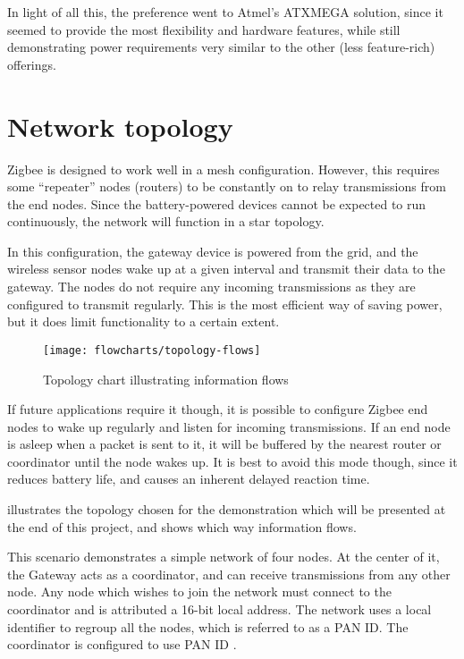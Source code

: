 In light of all this, the preference went to Atmel's ATXMEGA solution, since it
seemed to provide the most flexibility and hardware features, while still
demonstrating power requirements very similar to the other (less feature-rich)
offerings.


\pagebreak
\section{Network topology}
\label{sec:network-topology}

Zigbee is designed to work well in a mesh configuration. However, this requires
some ``repeater'' nodes (routers) to be constantly on to relay transmissions
from the end nodes. Since the battery-powered devices cannot be expected to run
continuously, the network will function in a star topology.

In this configuration, the gateway device is powered from the grid, and the
wireless sensor nodes wake up at a given interval and transmit their data to the
gateway. The nodes do not require any incoming transmissions as they are
configured to transmit regularly. This is the most efficient way of saving
power, but it does limit functionality to a certain extent.

\begin{figure}[h]
  \begin{center}
    \texttt{[image: flowcharts/topology-flows]}
  \end{center}
  \caption{Topology chart illustrating information flows}
  \label{fig:topology-flows}
\end{figure}

If future applications require it though, it is possible to configure Zigbee end
nodes to wake up regularly and listen for incoming transmissions. If an end node
is asleep when a packet is sent to it, it will be buffered by the nearest router
or coordinator until the node wakes up. It is best to avoid this mode though,
since it reduces battery life, and causes an inherent delayed reaction time.

 illustrates the topology chosen for the demonstration
which will be presented at the end of this project, and shows which way
information flows. 


This scenario demonstrates a simple network of four nodes. At the center of it,
the Gateway acts as a coordinator, and can receive transmissions from any other
node. Any node which wishes to join the network must connect to the coordinator
and is attributed a 16-bit local address. The network uses a local identifier to
regroup all the nodes, which is referred to as a PAN ID. The coordinator is
configured to use PAN ID .

